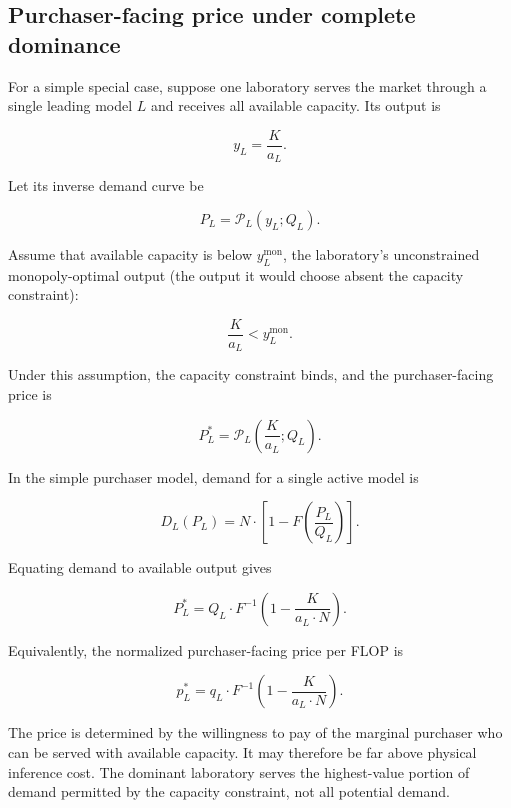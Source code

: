 \documentclass[11pt]{article}
\begin{document}
\subsection{Purchaser-facing price under complete dominance}

For a simple special case, suppose one laboratory serves the market through a single leading model $L$ and receives all available capacity. Its output is

\begin{equation}y_L=\frac{K}{a_L}.\end{equation}

Let its inverse demand curve be

\begin{equation}P_L=\mathcal P_L(y_L;Q_L).\end{equation}

Assume that available capacity is below $y_L^{\mathrm{mon}}$, the laboratory's unconstrained monopoly-optimal output (the output it would choose absent the capacity constraint):

\begin{equation}\frac{K}{a_L}<y_L^{\mathrm{mon}}.\end{equation}

Under this assumption, the capacity constraint binds, and the purchaser-facing price is

\begin{equation}P_L^*=\mathcal P_L\left(\frac{K}{a_L};Q_L\right).\end{equation}

In the simple purchaser model, demand for a single active model is

\begin{equation}D_L(P_L)=N\cdot\left[1-F\left(\frac{P_L}{Q_L}\right)\right].\end{equation}

Equating demand to available output gives

\begin{equation}P_L^*=Q_L\cdot F^{-1}\left(1-\frac{K}{a_L\cdot N}\right).\end{equation}

Equivalently, the normalized purchaser-facing price per FLOP is

\begin{equation}p_L^*=q_L\cdot F^{-1}\left(1-\frac{K}{a_L\cdot N}\right).\end{equation}

The price is determined by the willingness to pay of the marginal purchaser who can be served with available capacity. It may therefore be far above physical inference cost. The dominant laboratory serves the highest-value portion of demand permitted by the capacity constraint, not all potential demand.
\end{document}
